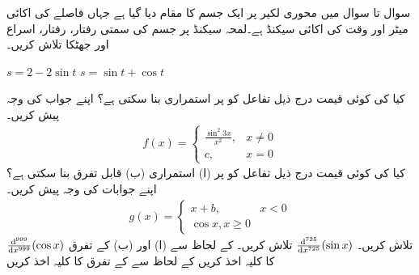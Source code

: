 سوال  تا سوال  میں محوری لکیر  پر ایک جسم کا مقام  دیا گیا ہے جہاں فاصلے کی اکائی میٹر اور وقت کی اکائی سیکنڈ ہے۔لمحہ  سیکنڈ پر جسم کی سمتی رفتار، رفتار، اسراع اور جھٹکا تلاش کریں۔


$s=2-2\sin t$
$s=\sin t+\cos t$

کیا  کی کوئی قیمت درج ذیل تفاعل کو  پر استمراری بنا سکتی ہے؟ اپنے جواب کی وجہ پیش کریں۔
\begin{align*}
f(x)=
\begin{cases}
\tfrac{\sin^2 3x}{x^2},&x\ne 0\\
c,&x=0
\end{cases}
\end{align*}
کیا  کی کوئی قیمت درج ذیل تفاعل کو  پر (ا) استمراری (ب) قابل تفرق  بنا سکتی ہے؟ اپنے جوابات کی وجہ پیش کریں۔ 
\begin{align*}
g(x)=
\begin{cases}
x+b,&x<0\\
\cos x,x\ge 0
\end{cases}
\end{align*}
$\tfrac{\dif^{\,999}}{\dif x^{999}}(\cos x)$
تلاش کریں۔
$\tfrac{\dif^{\,725}}{\dif x^{725}}(\sin x)$ 
تلاش کریں۔
 کے لحاظ سے (ا)  اور (ب)  کے تفرق کا کلیہ اخذ کریں
 کے لحاظ سے   کے تفرق کا کلیہ اخذ کریں

